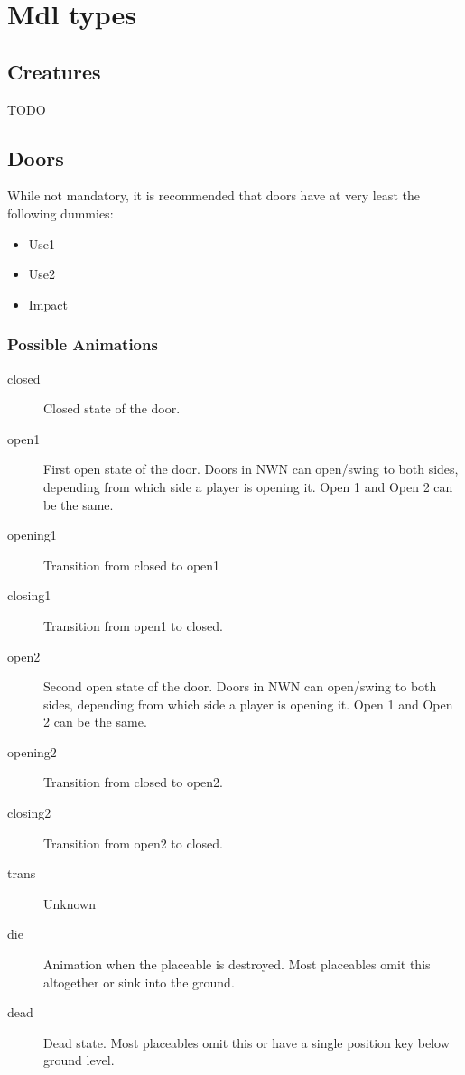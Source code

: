 \chapter{Mdl types}

\section{Creatures}
TODO

\section{Doors}
While not mandatory, it is recommended that doors have at very least the
following dummies:
\begin{itemize}
\item Use1
\item Use2
\item Impact
\end{itemize}

\subsection*{Possible Animations}
\begin{description}
    \item[closed] Closed state of the door.
    \item[open1] First open state of the door. Doors in NWN can open/swing to both sides, depending from which side a player is opening it. Open 1 and Open 2 can be the same.
    \item[opening1] Transition from closed to open1
    \item[closing1] Transition from open1 to closed.
    \item[open2] Second open state of the door. Doors in NWN can open/swing to both sides, depending from which side a player is opening it. Open 1 and Open 2 can be the same.
    \item[opening2] Transition from closed to open2.
    \item[closing2] Transition from open2 to closed.
    \item[trans] Unknown
    \item[die] Animation when the placeable is destroyed. Most placeables omit this altogether or sink into the ground.
    \item[dead] Dead state. Most placeables omit this or have a single position key below ground level.
\end{description}

